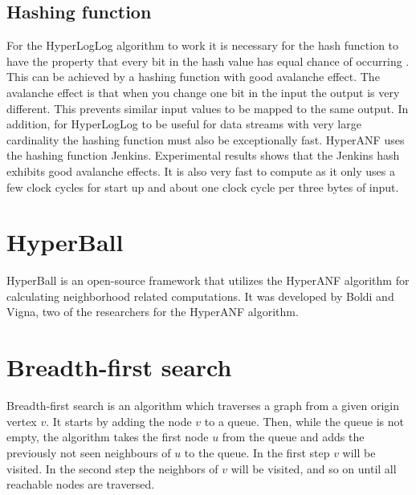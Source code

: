 \subsection{Hashing function}
For the HyperLogLog algorithm to work it is necessary for the hash function to have the property that every bit in the hash value has equal chance of occurring \cite{hyperloglog}. This can be achieved by a hashing function with good avalanche effect. The avalanche effect is that when you change one bit in the input the output is very different. This prevents similar input values to be mapped to the same output. In addition, for HyperLogLog to be useful for data streams with very large cardinality the hashing function must also be exceptionally fast. HyperANF uses the hashing function Jenkins. Experimental results shows that the Jenkins hash exhibits good avalanche effects. It is also very fast to compute as it only uses a few clock cycles for start up and about one clock cycle per three bytes of input.

\iffalse
\subsection{BroadWord}
Broadword is a way to do several calculations at the same time using cleverly constructed binary-logic expressions. HyperANF uses broadword to take the union $U$ of two HyperLogLog counters $A$ and $B$, which effectively is taking $\forall i; U_i = max(A_i,B_i)$
\fi


\section{HyperBall}
HyperBall is an open-source framework that utilizes the HyperANF algorithm for calculating neighborhood related computations. It was developed by Boldi and Vigna, two of the researchers for the HyperANF algorithm.

\section{Breadth-first search}

Breadth-first search is an algorithm which traverses a graph from a given origin vertex $v$. It starts by adding the node $v$ to a queue. Then, while the queue is not empty, the algorithm takes the first node $u$ from the queue and adds the previously not seen neighbours of $u$ to the queue. In the first step $v$ will be visited. In the second step the neighbors of $v$ will be visited, and so on until all reachable nodes are traversed.

